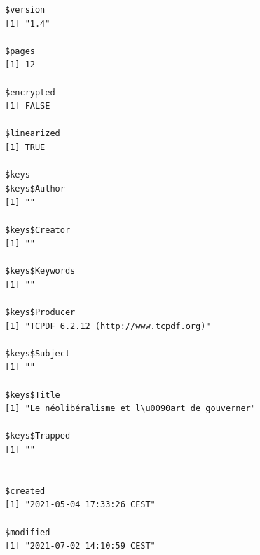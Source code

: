 \documentclass[
  letterpaper,
  DIV=11,
  numbers=noendperiod]{scrreprt}
\begin{document}
\begin{verbatim}
$version
[1] "1.4"

$pages
[1] 12

$encrypted
[1] FALSE

$linearized
[1] TRUE

$keys
$keys$Author
[1] ""

$keys$Creator
[1] ""

$keys$Keywords
[1] ""

$keys$Producer
[1] "TCPDF 6.2.12 (http://www.tcpdf.org)"

$keys$Subject
[1] ""

$keys$Title
[1] "Le néolibéralisme et l\u0090art de gouverner"

$keys$Trapped
[1] ""


$created
[1] "2021-05-04 17:33:26 CEST"

$modified
[1] "2021-07-02 14:10:59 CEST"


\end{verbatim}
\end{document}
